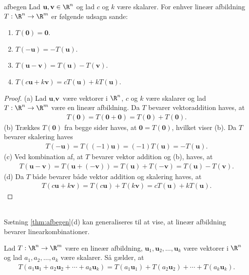 \begin{thm}{}{afbegen}
Lad $\textbf{u}, \textbf{v} \in \R^n$ og lad $c$ og $k$ være skalarer.
For enhver lineær afbildning $T: \R^n \rightarrow \R^m$ er følgende udsagn sande:
\begin{enumerate}[label = (\alph*)]
\item $T(\textbf{0}) = \textbf{0}$.
\item $T(-\textbf{u}) = -T(\textbf{u})$.
\item $T(\textbf{u}-\textbf{v}) = T(\textbf{u})-T(\textbf{v})$.
\item $T(c\textbf{u} + k\textbf{v}) = cT(\textbf{u}) + kT(\textbf{u})$.
\end{enumerate}
\end{thm}
%
\begin{proof}
(a) 
Lad $\textbf{u}, \textbf{v}$ være vektorer i $\R^n$, $c$ og $k$ være skalarer og lad $T: \R^n \rightarrow \R^m$ være en lineær afbildning.
Da $T$ bevarer vektoraddition haves, at
%
\begin{align*}
T(\textbf{0}) = T(\textbf{0} + \textbf{0}) = T(\textbf{0}) + T(\textbf{0}).
\end{align*}
%
(b) 
Trækkes $T(\textbf{0})$ fra begge sider haves, at $\textbf{0} = T(\textbf{0})$, hvilket viser (b).
%
Da $T$ bevarer skalering haves
% 
\begin{align*}
T(-\textbf{u}) = T((-1)\textbf{u}) = (-1)T(\textbf{u}) = -T(\textbf{u}).
\end{align*}
%
(c) 
Ved kombination af, at $T$ bevarer vektor addition og (b), haves, at
%
\begin{align*}
T(\textbf{u}-\textbf{v}) = T(\textbf{u}+(-\textbf{v})) = T(\textbf{u})+T(-\textbf{v}) = T(\textbf{u}) - T(\textbf{v}).
\end{align*}
%
(d) 
Da $T$ både bevarer både vektor addition og skalering haves, at 
%
\begin{align*}
T(c\textbf{u} + k\textbf{v}) = T(c\textbf{u}) + T(k\textbf{v}) = cT(\textbf{u}) + kT(\textbf{u}).
\end{align*}
\end{proof}
%
\\
Sætning \ref{thm:afbegen}(d) kan generaliseres til at vise, at lineær afbildning bevarer linearkombinationer.
\begin{lem}{}{}
Lad $T:\R^n \rightarrow \R^m$ være en lineær afbildning, $\textbf{u}_1,\textbf{u}_2,\ldots,\textbf{u}_k$ være vektorer i $\R^n$ og lad $a_1,a_2,\ldots,a_k$ være skalarer. 
Så gælder, at
%
\begin{align*}
T(a_1\textbf{u}_1 + a_2\textbf{u}_2 + \cdots + a_k\textbf{u}_k) = T(a_1\textbf{u}_1) + T(a_2\textbf{u}_2) + \cdots + T(a_k\textbf{u}_k).
\end{align*}
%
\end{lem}
